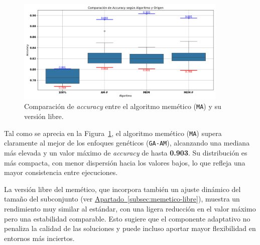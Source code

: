 \begin{figure}[htp]
    \centering
    \includegraphics[width=0.9\textwidth]{imagenes/evaluaciones/comparacion-memetico}
    \caption{Comparación de \textit{accuracy} entre el algoritmo memético (\texttt{MA}) y su versión libre.}
    \label{fig:memetico_comparacion}
\end{figure}

Tal como se aprecia en la Figura~\ref{fig:memetico_comparacion}, el algoritmo memético (\texttt{MA}) supera claramente al mejor de los enfoques genéticos
(\texttt{GA-AM}), alcanzando una mediana más elevada y un valor máximo de \textit{accuracy} de hasta \textbf{0.903}.
Su distribución es más compacta, con menor dispersión hacia los valores bajos, lo que refleja una mayor consistencia entre ejecuciones.

La versión libre del memético, que incorpora también un ajuste dinámico del tamaño del subconjunto
(ver \hyperref[subsec:memetico-libre]{Apartado~\ref*{subsec:memetico-libre}}), muestra un rendimiento muy similar al estándar,
con una ligera reducción en el valor máximo pero una estabilidad comparable.
Esto sugiere que el componente adaptativo no penaliza la calidad de las soluciones y puede incluso aportar mayor flexibilidad en entornos más inciertos.


